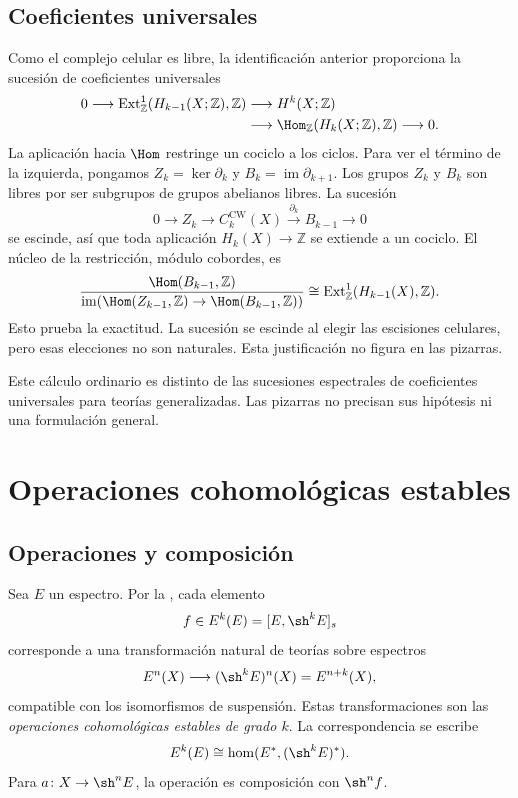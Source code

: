 \subsection{Coeficientes universales}
Como el complejo celular es libre, la identificación anterior proporciona la sucesión de coeficientes universales
\[
\begin{aligned}
0\longrightarrow\operatorname{Ext}^1_{\mathbb Z}(H_{k-1}(X;\mathbb Z),\mathbb Z)
&\longrightarrow H^k(X;\mathbb Z)\\
&\longrightarrow\Hom_{\mathbb Z}(H_k(X;\mathbb Z),\mathbb Z)
\longrightarrow0.
\end{aligned}
\]
La aplicación hacia $\Hom$ restringe un cociclo a los ciclos. Para ver el término de la izquierda, pongamos $Z_k=\ker\partial_k$ y $B_k=\operatorname{im}\partial_{k+1}$. Los grupos $Z_k$ y $B_k$ son libres por ser subgrupos de grupos abelianos libres. La sucesión
\[
0\longrightarrow Z_k\longrightarrow C_k^{\mathrm{CW}}(X)
\xrightarrow{\partial_k}B_{k-1}\longrightarrow0
\]
se escinde, así que toda aplicación $H_k(X)\to\mathbb Z$ se extiende a un cociclo. El núcleo de la restricción, módulo cobordes, es
\[
\frac{\Hom(B_{k-1},\mathbb Z)}
{\operatorname{im}(\Hom(Z_{k-1},\mathbb Z)\to\Hom(B_{k-1},\mathbb Z))}
\cong\operatorname{Ext}^1_{\mathbb Z}(H_{k-1}(X),\mathbb Z).
\]
Esto prueba la exactitud. La sucesión se escinde al elegir las escisiones celulares, pero esas elecciones no son naturales. Esta justificación no figura en las pizarras.

Este cálculo ordinario es distinto de las sucesiones espectrales de coeficientes universales para teorías generalizadas. Las pizarras no precisan sus hipótesis ni una formulación general.

\section{Operaciones cohomológicas estables}

\subsection{Operaciones y composición}
Sea $E$ un espectro. Por la , cada elemento
\[
f\in E^k(E)=[E,\sh^kE]_s
\]
corresponde a una transformación natural de teorías sobre espectros
\[
E^n(X)\longrightarrow(\sh^kE)^n(X)=E^{n+k}(X),
\]
compatible con los isomorfismos de suspensión. Estas transformaciones son las \emph{operaciones cohomológicas estables de grado $k$}. La correspondencia se escribe
\[
E^k(E)\cong\hom(E^*,(\sh^kE)^*).
\]
Para $a\colon X\to\sh^nE$, la operación es composición con $\sh^nf$.

